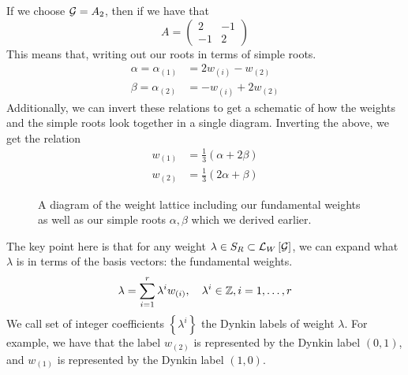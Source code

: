 \begin{example}
 	If we choose $ \mathcal{ G }  = A _ 2 $, then if we 
	have that 
	\[
		A  = \begin{pmatrix}  2 & - 1 \\ - 1 &  2  \end{pmatrix}  
	\] This means that, writing out our roots in terms of simple roots. 
	\begin{align*}
		\alpha = \alpha _{ \left( 1  \right)  }  & = 2 w _{ \left( i  \right)  }  - w _{ \left( 2  \right)  } \\
		\beta  = \alpha _{ \left( 2  \right)  }   &= - w _{ \left( i  \right)  } + 2 w _{ \left( 2  \right)  }
	\end{align*}
	Additionally, we can invert these relations to get 
	a schematic of how the weights and the simple roots look 
	together in a single diagram. Inverting the above, we get the relation 
	\begin{align*}
		w_{ \left( 1  \right)  } &=  \frac{1}{3 } \left( \alpha + 2 \beta  \right)   \\
		w_{ \left( 2  \right)  } &=  \frac{1}{3 } \left( 2 \alpha + \beta  \right) 
	\end{align*}
	\begin{figure}[h]
		\centering
		
		\caption{A diagram of the weight lattice including 
		our fundamental weights as well as our simple roots 
	$ \alpha, \beta $ which we derived earlier.}%
		\label{fig:weight-lattice}
	\end{figure}
 \end{example}
The key point here is that for any weight $ \lambda \in S _ R 
\subset \mathcal{ L } _ W \left[  \mathcal{ G }  \right] $, we can expand what $ \lambda $ is in terms of the
basis vectors: the fundamental weights. 
	\[
		\lambda = \sum _{ i = 1 } ^ r \lambda ^ i w _{ \left( i  \right)  }, \quad \lambda ^ i \in \mathbb{Z}, 
		i = 1 , \dots , r 
	\] We call set of integer coefficients $ \left\{  \lambda ^ i  \right\} $
	the Dynkin labels of weight $ \lambda $. For example, 
	we have that the label $ w_{ \left( 2  \right)  } $ is
	represented by the Dynkin label $ \left( 0 , 1  \right)  $, 
	and $ w _{ (1 ) } $ is represented by the Dynkin label 
	$ ( 1, 0 ) $. 


